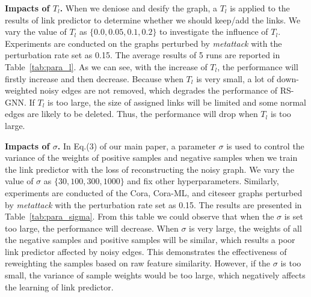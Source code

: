 \documentclass[sigconf,review, nonacm]{acmart}
\begin{document}
\textbf{Impacts of $T_l$.} When we deniose and desify the graph, a $T_l$ is applied to the results of link predictor to determine whether we should keep/add the links. We vary the value of $T_l$ as $\{0.0, 0.05, 0.1, 0.2\}$ to investigate the influence of $T_l$. Experiments are conducted on the graphs perturbed by \textit{metattack} with the perturbation rate set as 0.15. The average results of 5 runs are reported in Table~\ref{tab:para_l}.  As we can see, with the increase of $T_l$, the performance will firstly increase and then decrease. Because when $T_l$ is very small, a lot of down-weighted noisy edges are not removed, which degrades the performance of RS-GNN. If $T_l$ is too large, the size of assigned links will be limited and some normal edges are likely to be deleted. Thus, the performance will drop when $T_l$ is too large.

\textbf{Impacts of $\sigma$.} In Eq.(3) of our main paper, a parameter $\sigma$ is used to control the variance of the weights of positive samples and negative samples when we train the link predictor with the loss of reconstructing the noisy graph. We vary the value of $\sigma$ as $\{30, 100, 300, 1000\}$ and fix other hyperparameters. Similarly, experiments are conducted of the Cora, Cora-ML, and citeseer graphs perturbed by \textit{metattack} with the perturbation rate set as 0.15. The results are presented in Table~\ref{tab:para_sigma}. From this table we could observe that when the $\sigma$ is set too large, the performance will decrease. When $\sigma$ is very large, the weights of all the negative samples and positive samples will be similar, which results a poor link predictor affected by noisy edges. This demonstrates the effectiveness of reweighting the samples based on raw feature similarity. However, if the $\sigma$ is too small, the variance of sample weights would be too large, which negatively affects the learning of link predictor.
\end{document}
